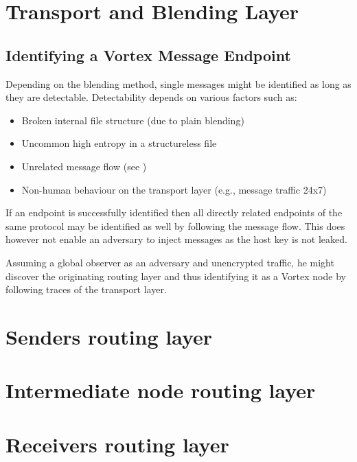 \section{Transport and Blending Layer}

\subsection{Identifying a Vortex Message Endpoint}
Depending on the blending method, single messages might be identified as long as they are detectable. Detectability depends on various factors such as:

\begin{itemize}
	\item Broken internal file structure (due to plain blending)
	\item Uncommon high entropy in a structureless file
	\item Unrelated message flow (see \cite{oakland2013-parrot})
	\item Non-human behaviour on the transport layer (e.g., message traffic 24x7)
\end{itemize}

If an endpoint is successfully identified then all directly related endpoints of the same protocol may be identified as well by following the message flow. This does however not enable an adversary to inject messages as the host key is not leaked. 

Assuming a global observer as an adversary and unencrypted traffic, he might discover the originating routing layer and thus identifying it as a Vortex node by following traces of the transport layer.

\section{Senders routing layer}

\section{Intermediate node routing layer}

\section{Receivers routing layer}

